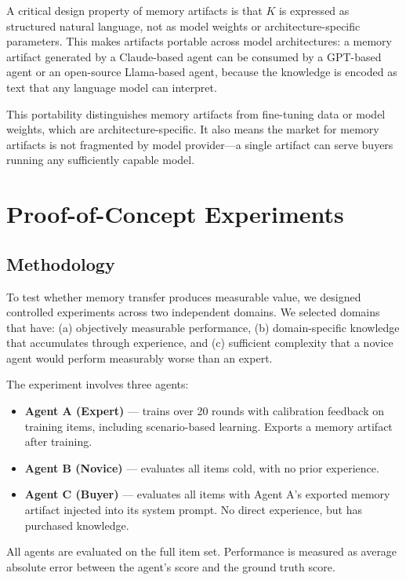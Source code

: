 \documentclass[11pt]{article}
\begin{document}
A critical design property of memory artifacts is that $K$ is expressed as structured natural language, not as model weights or architecture-specific parameters. This makes artifacts portable across model architectures: a memory artifact generated by a Claude-based agent can be consumed by a GPT-based agent or an open-source Llama-based agent, because the knowledge is encoded as text that any language model can interpret.

This portability distinguishes memory artifacts from fine-tuning data or model weights, which are architecture-specific. It also means the market for memory artifacts is not fragmented by model provider---a single artifact can serve buyers running any sufficiently capable model.

\section{Proof-of-Concept Experiments}
\label{sec:experiments}

\subsection{Methodology}

To test whether memory transfer produces measurable value, we designed controlled experiments across two independent domains. We selected domains that have: (a) objectively measurable performance, (b) domain-specific knowledge that accumulates through experience, and (c) sufficient complexity that a novice agent would perform measurably worse than an expert.

The experiment involves three agents:
\begin{itemize}[leftmargin=2em]
  \item \textbf{Agent A (Expert)} --- trains over 20 rounds with calibration feedback on training items, including scenario-based learning. Exports a memory artifact after training.
  \item \textbf{Agent B (Novice)} --- evaluates all items cold, with no prior experience.
  \item \textbf{Agent C (Buyer)} --- evaluates all items with Agent A's exported memory artifact injected into its system prompt. No direct experience, but has purchased knowledge.
\end{itemize}

All agents are evaluated on the full item set. Performance is measured as average absolute error between the agent's score and the ground truth score.
\end{document}
